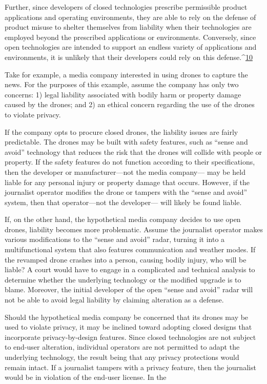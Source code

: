 \begin{itemize}
Further, since developers of closed technologies prescribe permissible product
applications and operating environments, they are able to rely on the
defense of product misuse to shelter themselves from liability when their
technologies are employed beyond the prescribed applications or environments.
Conversely, since open technologies are intended to support an
endless variety of applications and environments, it is unlikely that their
developers could rely on this defense.^{\href{#endnotes-cooper}{10}}

Take for example, a media company interested in using drones to capture
the news. For the purposes of this example, assume the company has only two concerns: 1) legal liability associated with bodily harm or property
damage caused by the drones; and 2) an ethical concern regarding the use
of the drones to violate privacy.

If the company opts to procure closed drones, the liability issues are fairly
predictable. The drones may be built with safety features, such as ``sense
and avoid'' technology that reduces the risk that the drones will collide with
people or property. If the safety features do not function according to their
specifications, then the developer or manufacturer—not the media company—
may be held liable for any personal injury or property damage that
occurs. However, if the journalist operator modifies the drone or tampers
with the ``sense and avoid'' system, then that operator—not the developer—
will likely be found liable.

If, on the other hand, the hypothetical media company decides to use open
drones, liability becomes more problematic. Assume the journalist operator
makes various modifications to the ``sense and avoid'' radar, turning it into
a multifunctional system that also features communication and weather
modes. If the revamped drone crashes into a person, causing bodily injury,
who will be liable? A court would have to engage in a complicated and technical
analysis to determine whether the underlying technology or the modified
upgrade is to blame. Moreover, the initial developer of the open ``sense
and avoid'' radar will not be able to avoid legal liability by claiming alteration
as a defense.

Should the hypothetical media company be concerned that its drones may
be used to violate privacy, it may be inclined toward adopting closed designs
that incorporate privacy-by-design features. Since closed technologies are
not subject to end-user alteration, individual operators are not permitted to
adapt the underlying technology, the result being that any privacy protections
would remain intact. If a journalist tampers with a privacy feature,
then the journalist would be in violation of the end-user license. In the


\end{itemize}
